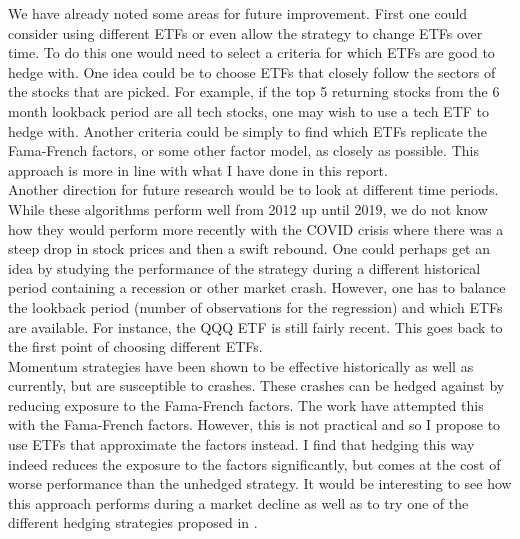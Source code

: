 \documentclass[10pt, letterpaper]{article}
\begin{document}
We have already noted some areas for future improvement.  First one could consider using different ETFs or even allow the strategy to change ETFs over time.  To do this one would need to select a criteria for which ETFs are good to hedge with.  One idea could be to choose ETFs that closely follow the sectors of the stocks that are picked.  For example, if the top 5 returning stocks from the 6 month lookback period are all tech stocks, one may wish to use a tech ETF to hedge with.  Another criteria could be simply to find which ETFs replicate the Fama-French factors, or some other factor model, as closely as possible.  This approach is more in line with what I have done in this report.\\

Another direction for future research would be to look at different time periods.  While these algorithms perform well from 2012 up until 2019, we do not know how they would perform more recently with the COVID crisis where there was a steep drop in stock prices and then a swift rebound.  One could perhaps get an idea by studying the performance of the strategy during a different historical period containing a recession or other market crash.  However, one has to balance the lookback period (number of observations for the regression) and which ETFs are available.  For instance, the QQQ ETF is still fairly recent.  This goes back to the first point of choosing different ETFs.\\

Momentum strategies have been shown to be effective historically as well as currently, but are susceptible to crashes.  These crashes can be hedged against by reducing exposure to the Fama-French factors.  The work \cite{MvO} have attempted this with the Fama-French factors.  However, this is not practical and so I propose to use ETFs that approximate the factors instead.  I find that hedging this way indeed reduces the exposure to the factors significantly, but comes at the cost of worse performance than the unhedged strategy.  It would be interesting to see how this approach performs during a market decline as well as to try one of the different hedging strategies proposed in \cite{MvO}.


\nocite{*}


\end{document}
